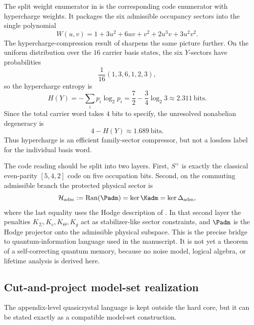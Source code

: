 The split weight enumerator in  is the corresponding code enumerator with hypercharge weights. It packages the six admissible occupancy sectors into the single polynomial
\[
W(u,v)
=
1+3u^2+6uv+v^2+2u^3v+3u^2v^2.
\]
The hypercharge-compression result of  sharpens the same picture further. On the uniform distribution over the $16$ carrier basis states, the six $Y$-sectors have probabilities
\[
\frac1{16}(1,3,6,1,2,3),
\]
so the hypercharge entropy is
\[
H(Y)
=
-\sum_i p_i\log_2 p_i
=
\frac72-\frac34\log_2 3
\approx
\num{2.311}\ \text{bits}.
\]
Since the total carrier word takes $4$ bits to specify, the unresolved nonabelian degeneracy is
\[
4-H(Y)\approx \num{1.689}\ \text{bits}.
\]
Thus hypercharge is an efficient family-sector compressor, but not a lossless label for the individual basis word.

\begin{remark}
The code reading should be split into two layers. First, $S^+$ is exactly the classical even-parity $[5,4,2]$ code on five occupation bits. Second, on the commuting admissible branch the protected physical sector is
\[
\mathcal H_{\mathrm{adm}}
:=
\operatorname{Ran}(\Padm)
=
\ker \Kadm
=
\ker \Delta_{\mathrm{adm}},
\]
where the last equality uses the Hodge description of . In that second layer the penalties $K_\Sigma,K_c,K_\Theta,K_g$ act as stabilizer-like sector constraints, and $\Padm$ is the Hodge projector onto the admissible physical subspace. This is the precise bridge to quantum-information language used in the manuscript. It is not yet a theorem of a self-correcting quantum memory, because no noise model, logical algebra, or lifetime analysis is derived here.
\end{remark}

\subsection{Cut-and-project model-set realization}

The appendix-level quasicrystal language is kept outside the hard core, but it can be stated
exactly as a compatible model-set construction.

